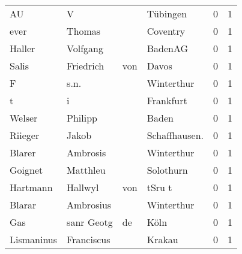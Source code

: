 \begin{center}
\begin{tiny}
\begin{longtabu}{llllrr}
                       AU &                                  V &             &                                    Tübingen &          0 &         1 \\
                     ever &                             Thomas &             &                                    Coventry &          0 &         1 \\
                   Haller &                           Volfgang &             &                                     BadenAG &          0 &         1 \\
                    Salis &                          Friedrich &         von &                                       Davos &          0 &         1 \\
                        F &                               s.n. &             &                                  Winterthur &          0 &         1 \\
                        t &                                  i &             &                                   Frankfurt &          0 &         1 \\
                   Welser &                            Philipp &             &                                       Baden &          0 &         1 \\
                  Riieger &                              Jakob &             &                              Schaffhausen.  &          0 &         1 \\
                   Blarer &                           Ambrosis &             &                                  Winterthur &          0 &         1 \\
                  Goignet &                           Matthleu &             &                                   Solothurn &          0 &         1 \\
                 Hartmann &                            Hallwyl &         von &                                      tSru t &          0 &         1 \\
                   Blarar &                          Ambrosius &             &                                  Winterthur &          0 &         1 \\
                      Gas &                         sanr Geotg &          de &                                        Köln &          0 &         1 \\
               Lismaninus &                         Franciscus &             &                                      Krakau &          0 &         1 \\

\end{longtabu}
\end{tiny}
\end{center}
